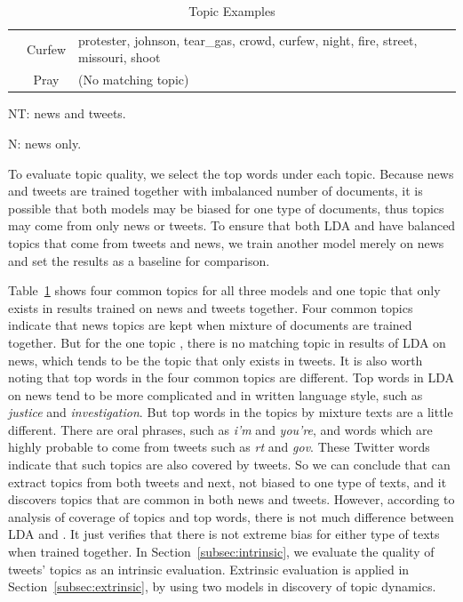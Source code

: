 \begin{table}[htpb]
\begin{threeparttable}
\begin{tabular}{|c|c|l|}
 & Curfew & protester, johnson, tear\_gas, crowd, curfew, night, fire, street, missouri, shoot\\ \cline{2-3}
 & Pray & (No matching topic)\\ \hline
\end{tabular}
\begin{tablenotes}
\footnotesize
\item[1] NT: news and tweets.
\item[2] N: news only.
\end{tablenotes}
\caption{Topic Examples}\label{tab:topic}
\end{threeparttable}
\end{table}

To evaluate topic quality, we select the top words under each topic. Because news and tweets are trained together with imbalanced number of documents, it is possible that both models may be biased for one type of documents, thus topics may come from only news or tweets. To ensure that both LDA and \stlda have balanced topics that come from tweets and news, we train another model merely on news and set the results as a baseline for comparison.

Table~\ref{tab:topic} shows four common topics for all three models and one topic that only exists in results trained on news and tweets together. Four common topics indicate that news topics are kept when mixture of documents are trained together. But for the one topic \pray, there is no matching topic in results of LDA on news, which tends to be the topic that only exists in tweets. It is also worth noting that top words in the four common topics are different. Top words in LDA on news tend to be more complicated and in written language style, such as \emph{justice} and \emph{investigation}. But top words in the topics by mixture texts are a little different. There are oral phrases, such as \emph{i'm} and \emph{you're}, and words which are highly probable to come from tweets such as \emph{rt} and \emph{gov}. These Twitter words indicate that such topics are also covered by tweets. So we can conclude that \stlda can extract topics from both tweets and next, not biased to one type of texts, and it discovers topics that are common in both news and tweets. However, according to analysis of coverage of topics and top words, there is not much difference between LDA and \stlda. It just verifies that there is not extreme bias for either type of texts when trained together. In Section~\ref{subsec:intrinsic}, we evaluate the quality of tweets' topics as an intrinsic evaluation. Extrinsic evaluation is applied in Section~\ref{subsec:extrinsic}, by using two models in discovery of topic dynamics.


